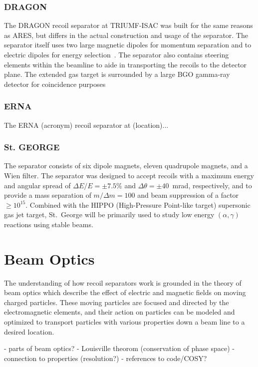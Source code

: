\subsubsection{DRAGON}

The DRAGON recoil separator at TRIUMF-ISAC was built for the same reasons as ARES,
but differs in the actual construction and usage of the separator.
The separator
itself uses two large magnetic dipoles for momentum separation and to electric
dipoles for energy selection~\cite{Engel2005}. The separator also contains
steering elements within the beamline to aide in transporting the recoils to
the detector plane. The extended gas target is surrounded by a large BGO
gamma-ray detector for coincidence purposes

\subsubsection{ERNA}

The ERNA (acronym) recoil separator at (location)...


\subsubsection{St. GEORGE}
The separator consists of six dipole magnets, eleven quadrupole magnets, and a
Wien filter. The separator was designed to accept recoils with a maximum
energy and angular spread of $\Delta E/E = \pm7.5\%$ and
$\Delta\theta = \pm40$~mrad, respectively, and to provide a mass separation
of $m/\Delta m = 100$ and beam suppression of a factor $\geq 10^{15}$. Combined
with the HIPPO (High-Pressure Point-like target) supersonic gas jet target,
St.\ George will be primarily used to study low energy $(\alpha,\gamma)$
reactions using stable beams.



\section{Beam Optics}


The understanding of how recoil separators work is grounded in the theory of
beam optics which describe the effect of electric and magnetic fields on moving
charged particles. These moving particles are focused and directed by the
electromagnetic elements, and their action on particles can be modeled and
optimized to transport particles with various properties down a beam line to a
desired location.

- parts of beam optics?
- Louisville theorom (conservation of phase space)
- connection to properties (resolution?)
- references to code/COSY?

